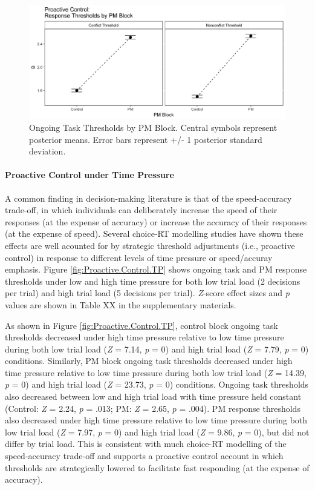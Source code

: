 \documentclass[11pt,]{article}
\let\oldparagraph\paragraph
\renewcommand{\paragraph}[1]{\oldparagraph{#1}\mbox{}}
\begin{document}
\begin{figure}
\includegraphics[width=0.8\linewidth]{figures/E1/E1.Proactive.Control.PM} \caption{\label{fig:Proactive.Control.PM}Ongoing Task Thresholds by PM Block. Central symbols represent posterior means. Error bars represent +/- 1 posterior standard deviation.}\label{fig:Plot: Proactive Control PM}
\end{figure}

\paragraph{Proactive Control under Time
Pressure}\label{proactive-control-under-time-pressure}

A common finding in decision-making literature is that of the
speed-accuracy trade-off, in which individuals can deliberately increase
the speed of their responses (at the expense of accuracy) or increase
the accuracy of their responses (at the expense of speed). Several
choice-RT modelling studies have shown these effects are well acounted
for by strategic threshold adjustments (i.e., proactive control) in
response to different levels of time pressure or speed/accuray emphasis.
Figure \ref{fig:Proactive.Control.TP} shows ongoing task and PM response
thresholds under low and high time pressure for both low trial load (2
decisions per trial) and high trial load (5 decisions per trial).
\emph{Z}-score effect sizes and \emph{p} values are shown in Table XX in
the supplementary materials.

As shown in Figure \ref{fig:Proactive.Control.TP}, control block ongoing
task thresholds decreased under high time pressure relative to low time
pressure during both low trial load (\emph{Z} = 7.14, \emph{p} = 0) and
high trial load (\emph{Z} = 7.79, \emph{p} = 0) conditions. Similarly,
PM block ongoing task thresholds decreased under high time pressure
relative to low time pressure during both low trial load (\emph{Z} =
14.39, \emph{p} = 0) and high trial load (\emph{Z} = 23.73, \emph{p} =
0) conditions. Ongoing task thresholds also decreased between low and
high trial load with time pressure held constant (Control: \emph{Z} =
2.24, \emph{p} = .013; PM: \emph{Z} = 2.65, \emph{p} = .004). PM
response thresholds also decreased under high time pressure relative to
low time pressure during both low trial load (\emph{Z} = 7.97, \emph{p}
= 0) and high trial load (\emph{Z} = 9.86, \emph{p} = 0), but did not
differ by trial load. This is consistent with much choice-RT modelling
of the speed-accuracy trade-off and supports a proactive control account
in which thresholds are strategically lowered to facilitate fast
responding (at the expense of accuracy).
\end{document}
